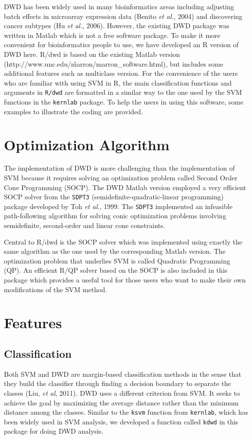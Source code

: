 \documentclass{bioinfo}
\begin{document}
DWD has been widely used in many bioinformatics areas including adjusting batch
effects in microarray expression data (Benito {\em et al.}, 2004) and
discovering cancer subtypes (Hu {\em et al.}, 2006). However, the existing
DWD package was written in Matlab which is not a free software package. To make it more
convenient for bioinformatics people to use, we have developed an R version of DWD
here. R/dwd is based on the existing Matlab version (http://www.unc.edu/\~ marron/marron\_software.html), but includes some
additional features such as multiclass version. For the
convenience of the users who are familiar with using SVM in R, the main
classification functions and arguments in \texttt{R/dwd} are formatted in a
similar way to the one used by the SVM functions in the \texttt{kernlab}
package. To help the users in using this software, some examples to illustrate
the coding are provided.

\section{Optimization Algorithm}
The implementation of DWD is more challenging than the implementation of SVM
because it requires solving an optimization problem called Second Order 
Cone Programming (SOCP).  The DWD Matlab version employed a very
efficient SOCP solver from the \texttt{SDPT3} (semidefinite-quadratic-linear
programming) package developed by Toh {\em et al.}, 1999. The \texttt{SDPT3}
implemented an infeasible path-following algorithm for solving conic
optimization problems involving semidefinite, second-order and linear cone
constraints.

Central to R/dwd is the SOCP solver which was implemented using exactly the
same algorithm as the one used by the corresponding Matlab version. The
optimization problem that underlies SVM is called Quadratic Programming (QP). An
efficient R/QP solver based on the SOCP is also included in this package which
provides a useful tool for those users who want to make their own modifications
of the SVM method.

\section{Features}

\subsection{Classification}
Both SVM and DWD are margin-based classification methods in the sense that they
build the classifier through finding a decision boundary to separate the
classes (Liu, {\em et al}, 2011). DWD uses a different criterion from SVM. It
seeks to achieve the goal by maximizing the average distance rather than the
minimum distance among the classes. Similar to the \texttt{ksvm} function from
\texttt{kernlab}, which has been widely used in SVM analysis, we developed a
function called \texttt{kdwd} in this package for doing DWD analysis.
\end{document}
